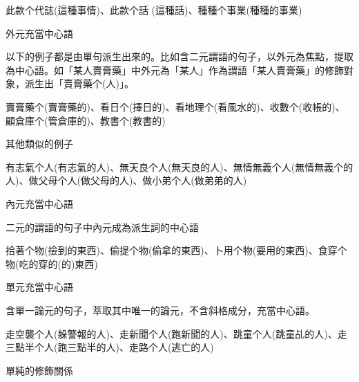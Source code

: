 \textrm{此款个代誌(這種事情)}、\textrm{此款个話 (這種話)}、\textrm{種種个事業(種種的事業)}

\begin{listWWviiiNumxivleveli}
\item \begin{styleqwerty}\rmfamily
外元充當中心語
\end{styleqwerty}
\end{listWWviiiNumxivleveli}

\textrm{以下的例子都是由單句派生出來的。比如含二元謂語的句子，以外元為焦點，提取為中心語。如「某人賣膏藥」中外元為「某人」作為謂語「某人賣膏藥」的修飾對象，派生出「賣膏藥个(人)」}。

\textrm{賣膏藥个(賣膏藥的)}、\textrm{看日个(擇日的)}、\textrm{看地理个(看風水的)}、\textrm{收數个(收帳的)}、\textrm{顧倉庫个(管倉庫的)}、\textrm{教書个(教書的)}

\rmfamily
其他類似的例子

\textrm{有志氣个人(有志氣的人)}、\textrm{無天良个人(無天良的人)}、\textrm{無情無義个人(無情無義个的人)}、\textrm{做父母个人(做父母的人)}、\textrm{做小弟个人(做弟弟的人)}

\begin{listWWviiiNumxivleveli}
\item \begin{styleqwerty}\rmfamily
內元充當中心語
\end{styleqwerty}
\end{listWWviiiNumxivleveli}
\rmfamily
二元的謂語的句子中內元成為派生詞的中心語

\textrm{拾著个物(撿到的東西)}、\textrm{偷提个物(偷拿的東西)}、\textrm{卜用个物(要用的東西)}、\textrm{食穿个物(吃的穿的(的)東西)}

\begin{listWWviiiNumxivleveli}
\item \begin{styleqwerty}\rmfamily
單元充當中心語
\end{styleqwerty}
\end{listWWviiiNumxivleveli}

\textrm{含單一論元的句子，萃取其中唯一的論元，不含斜格成分，充當中心語。}

\textrm{走空襲个人(躲警報的人)}、\textrm{走新聞个人(跑新聞的人)}、\textrm{跳童个人(跳童乩的人)}、\textrm{走三點半个人(跑三點半的人)}、\textrm{走路个人(逃亡的人)}

\begin{listWWviiiNumxivleveli}
\item \begin{styleqwerty}\rmfamily
單純的修飾關係
\end{styleqwerty}
\end{listWWviiiNumxivleveli}

